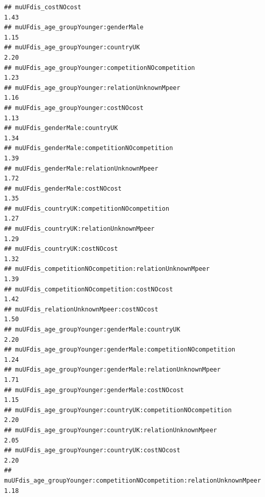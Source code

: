 \documentclass[
]{article}
\begin{document}
\begin{verbatim}
## muUFdis_costNOcost                                                                                     1.43
## muUFdis_age_groupYounger:genderMale                                                                    1.15
## muUFdis_age_groupYounger:countryUK                                                                     2.20
## muUFdis_age_groupYounger:competitionNOcompetition                                                      1.23
## muUFdis_age_groupYounger:relationUnknownMpeer                                                          1.16
## muUFdis_age_groupYounger:costNOcost                                                                    1.13
## muUFdis_genderMale:countryUK                                                                           1.34
## muUFdis_genderMale:competitionNOcompetition                                                            1.39
## muUFdis_genderMale:relationUnknownMpeer                                                                1.72
## muUFdis_genderMale:costNOcost                                                                          1.35
## muUFdis_countryUK:competitionNOcompetition                                                             1.27
## muUFdis_countryUK:relationUnknownMpeer                                                                 1.29
## muUFdis_countryUK:costNOcost                                                                           1.32
## muUFdis_competitionNOcompetition:relationUnknownMpeer                                                  1.39
## muUFdis_competitionNOcompetition:costNOcost                                                            1.42
## muUFdis_relationUnknownMpeer:costNOcost                                                                1.50
## muUFdis_age_groupYounger:genderMale:countryUK                                                          2.20
## muUFdis_age_groupYounger:genderMale:competitionNOcompetition                                           1.24
## muUFdis_age_groupYounger:genderMale:relationUnknownMpeer                                               1.71
## muUFdis_age_groupYounger:genderMale:costNOcost                                                         1.15
## muUFdis_age_groupYounger:countryUK:competitionNOcompetition                                            2.20
## muUFdis_age_groupYounger:countryUK:relationUnknownMpeer                                                2.05
## muUFdis_age_groupYounger:countryUK:costNOcost                                                          2.20
## muUFdis_age_groupYounger:competitionNOcompetition:relationUnknownMpeer                                 1.18

\end{verbatim}
\end{document}
